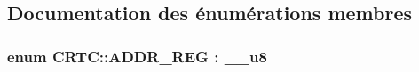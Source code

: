 \subsection{Documentation des énumérations membres}
\hypertarget{classCRTC_adf700236f14a2071204dc36a75cf4890}{
\subsubsection[{A\+D\+D\+R\+\_\+\+R\+E\+G}]{\setlength{\rightskip}{0pt plus 5cm}enum {\bf C\+R\+T\+C\+::\+A\+D\+D\+R\+\_\+\+R\+E\+G} \+: \+\_\+\+\_\+u8\hspace{0.3cm}{\ttfamily [strong]}}}\label{classCRTC_adf700236f14a2071204dc36a75cf4890}
